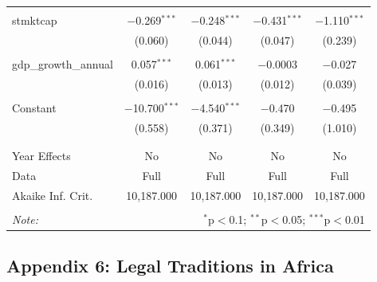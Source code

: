 \documentclass[a4paper,nobind]{templates/ociamthesis}
\begin{document}
\begin{table}[!htbp]
\begin{tabular}{@{\extracolsep{5pt}}lcccc}
  & & & & \\ 
 stmktcap & $-$0.269$^{***}$ & $-$0.248$^{***}$ & $-$0.431$^{***}$ & $-$1.110$^{***}$ \\ 
  & (0.060) & (0.044) & (0.047) & (0.239) \\ 
  & & & & \\ 
 gdp\_growth\_annual & 0.057$^{***}$ & 0.061$^{***}$ & $-$0.0003 & $-$0.027 \\ 
  & (0.016) & (0.013) & (0.012) & (0.039) \\ 
  & & & & \\ 
 Constant & $-$10.700$^{***}$ & $-$4.540$^{***}$ & $-$0.470 & $-$0.495 \\ 
  & (0.558) & (0.371) & (0.349) & (1.010) \\ 
  & & & & \\ 
\hline \\[-1.8ex] 
Year Effects & No & No & No & No \\ 
Data & Full & Full & Full & Full \\ 
Akaike Inf. Crit. & 10,187.000 & 10,187.000 & 10,187.000 & 10,187.000 \\ 
\hline 
\hline \\[-1.8ex] 
\textit{Note:}  & \multicolumn{4}{r}{$^{*}$p$<$0.1; $^{**}$p$<$0.05; $^{***}$p$<$0.01} \\ 
\end{tabular} 
\end{table}

\newpage

\hypertarget{appendix-6-legal-traditions-in-africa}{%
\subsection{Appendix 6: Legal Traditions in Africa}\label{appendix-6-legal-traditions-in-africa}}
\end{document}

